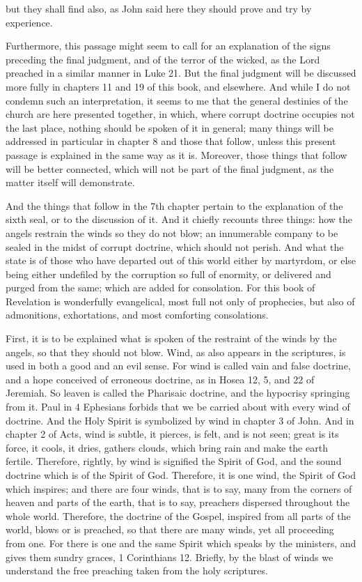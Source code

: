 but they shall find also, as John said here they should prove and try by experience.

Furthermore, this passage might seem to call for an explanation of the signs preceding the final judgment, and of the terror of the wicked, as the Lord preached in a similar manner in Luke 21. But the final judgment will be discussed more fully in chapters 11 and 19 of this book, and elsewhere. And while I do not condemn such an interpretation, it seems to me that the general destinies of the church are here presented together, in which, where corrupt doctrine occupies not the last place, nothing should be spoken of it in general; many things will be addressed in particular in chapter 8 and those that follow, unless this present passage is explained in the same way as it is. Moreover, those things that follow will be better connected, which will not be part of the final judgment, as the matter itself will demonstrate.

And the things that follow in the 7th chapter pertain to the explanation of the sixth seal, or to the discussion of it. And it chiefly recounts three things: how the angels restrain the winds so they do not blow; an innumerable company to be sealed in the midst of corrupt doctrine, which should not perish. And what the state is of those who have departed out of this world either by martyrdom, or else being either undefiled by the corruption so full of enormity, or delivered and purged from the same; which are added for consolation. For this book of Revelation is wonderfully evangelical, most full not only of prophecies, but also of admonitions, exhortations, and most comforting consolations.

First, it is to be explained what is spoken of the restraint of the winds by the angels, so that they should not blow. Wind, as also appears in the scriptures, is used in both a good and an evil sense. For wind is called vain and false doctrine, and a hope conceived of erroneous doctrine, as in Hosea 12, 5, and 22 of Jeremiah. So leaven is called the Pharisaic doctrine, and the hypocrisy springing from it. Paul in 4 Ephesians forbids that we be carried about with every wind of doctrine. And the Holy Spirit is symbolized by wind in chapter 3 of John. And in chapter 2 of Acts, wind is subtle, it pierces, is felt, and is not seen; great is its force, it cools, it dries, gathers clouds, which bring rain and make the earth fertile. Therefore, rightly, by wind is signified the Spirit of God, and the sound doctrine which is of the Spirit of God. Therefore, it is one wind, the Spirit of God which inspires; and there are four winds, that is to say, many from the corners of heaven and parts of the earth, that is to say, preachers dispersed throughout the whole world. Therefore, the doctrine of the Gospel, inspired from all parts of the world, blows or is preached, so that there are many winds, yet all proceeding from one. For there is one and the same Spirit which speaks by the ministers, and gives them sundry graces, 1 Corinthians 12. Briefly, by the blast of winds we understand the free preaching taken from the holy scriptures.

